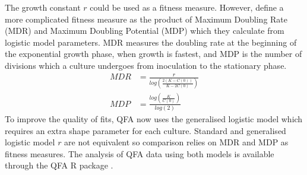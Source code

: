 The growth constant \(r\) could be used as a fitness measure. However,
\citet{Addinall2011} define a more complicated fitness measure as the
product of Maximum Doubling Rate (MDR) and Maximum Doubling Potential
(MDP) which they calculate from logistic model parameters. MDR measures
the doubling rate at the beginning of the exponential growth phase,
when growth is fastest, and MDP is the number of divisions which a
culture undergoes from inoculation to the stationary phase.
%
\begin{subequations}
  \label{eq:MDR_MDP}
    \begin{align}
      MDR &= \frac{r}{log\left(\frac{2(K-C(0))}{K-2C(0)}\right)}\\
      MDP &= \frac{log\left(\frac{K}{C(0)}\right)}{log(2)}
    \end{align}
\end{subequations}
%
To improve the quality of fits, QFA now uses the generalised logistic
model which requires an extra shape parameter for each
culture. Standard and generalised logistic model \(r\) are not
equivalent so comparison relies on MDR and MDP as fitness
measures. The analysis of QFA data using both models is available
through the QFA R package \citep{qfa2016}.



